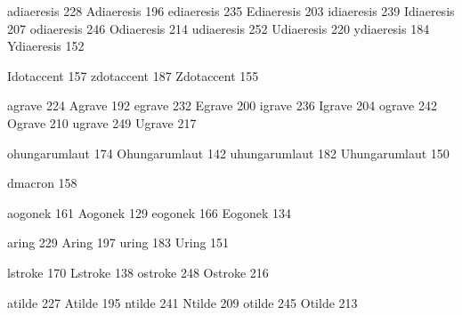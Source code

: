  adiaeresis      228
 Adiaeresis      196
 ediaeresis      235
 Ediaeresis      203
 idiaeresis      239
 Idiaeresis      207
 odiaeresis      246
 Odiaeresis      214
 udiaeresis      252
 Udiaeresis      220
 ydiaeresis      184
 Ydiaeresis      152

 Idotaccent      157
 zdotaccent      187
 Zdotaccent      155

 agrave          224
 Agrave          192
 egrave          232
 Egrave          200
 igrave          236
 Igrave          204
 ograve          242
 Ograve          210
 ugrave          249
 Ugrave          217

 ohungarumlaut   174
 Ohungarumlaut   142
 uhungarumlaut   182
 Uhungarumlaut   150

 dmacron         158

 aogonek         161
 Aogonek         129
 eogonek         166
 Eogonek         134

 aring           229
 Aring           197
 uring           183
 Uring           151

 lstroke         170
 Lstroke         138
 ostroke         248
 Ostroke         216

 atilde          227
 Atilde          195
 ntilde          241
 Ntilde          209
 otilde          245
 Otilde          213

\stopencoding

\endinput
